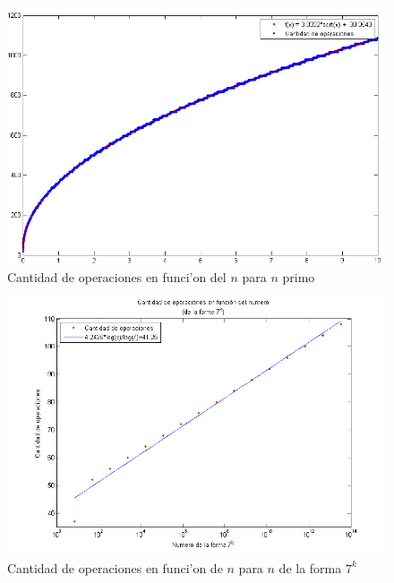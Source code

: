 \begin{figure}[H]
\centering
\includegraphics[scale=0.8]{../../codigo/ejercicio1/benchmark/graficos/primos/graficoPrimos.png}
\caption{Cantidad de operaciones en funci'on del $n$ para $n$ primo}
\end{figure}

\begin{figure}[H]
\centering
\includegraphics[scale=0.8]{../../codigo/ejercicio1/benchmark/graficos/potencias_de_7/graficoPotenciasDe7.png}
\caption{Cantidad de operaciones en funci'on de $n$ para $n$ de la forma $7^k$}
\end{figure}

